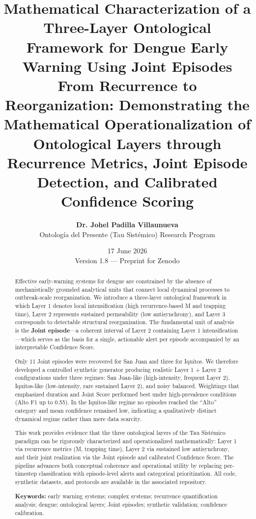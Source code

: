 \documentclass[11pt,a4paper]{article}
\title{\textbf{Mathematical Characterization of a Three-Layer Ontological Framework for Dengue Early Warning Using Joint Episodes}\\[0.35em]
\large From Recurrence to Reorganization: Demonstrating the Mathematical Operationalization of Ontological Layers through Recurrence Metrics, Joint Episode Detection, and Calibrated Confidence Scoring}
\author{
    \textbf{Dr. Johel Padilla Villaunueva} \\[0.25em]
    \small Ontolog\'ia del Presente (Tau Sist\'emico) Research Program
}
\date{17 June 2026 \\ \small Version 1.8 — Preprint for Zenodo}
\begin{document}
\maketitle

\begin{abstract}
\noindent Effective early-warning systems for dengue are constrained by the absence of mechanistically grounded analytical units that connect local dynamical processes to outbreak-scale reorganization. We introduce a three-layer ontological framework in which Layer 1 denotes local intensification (high recurrence-based M and trapping time), Layer 2 represents sustained permeability (low antisynchrony), and Layer 3 corresponds to detectable structural reorganization. The fundamental unit of analysis is the \textbf{Joint episode}—a coherent interval of Layer 2 containing Layer 1 intensification—which serves as the basis for a single, actionable alert per episode accompanied by an interpretable Confidence Score.

Only 11 Joint episodes were recovered for San Juan and three for Iquitos. We therefore developed a controlled synthetic generator producing realistic Layer 1 + Layer 2 configurations under three regimes: San Juan-like (high-intensity, frequent Layer 2), Iquitos-like (low-intensity, rare sustained Layer 2), and noisy balanced. Weightings that emphasized duration and Joint Score performed best under high-prevalence conditions (Alto F1 up to 0.55). In the Iquitos-like regime no episodes reached the ``Alto'' category and mean confidence remained low, indicating a qualitatively distinct dynamical regime rather than mere data scarcity.

This work provides evidence that the three ontological layers of the Tau Sistémico paradigm can be rigorously characterized and operationalized mathematically: Layer 1 via recurrence metrics (M, trapping time), Layer 2 via sustained low antisynchrony, and their joint realization via the Joint episode and calibrated Confidence Score. The pipeline advances both conceptual coherence and operational utility by replacing per-timestep classification with episode-level alerts and categorical prioritization. All code, synthetic datasets, and protocols are available in the associated repository.

\vspace{0.2em}
\noindent\textbf{Keywords:} early warning systems; complex systems; recurrence quantification analysis; dengue; ontological layers; Joint episodes; synthetic validation; confidence calibration.
\end{abstract}
\end{document}
